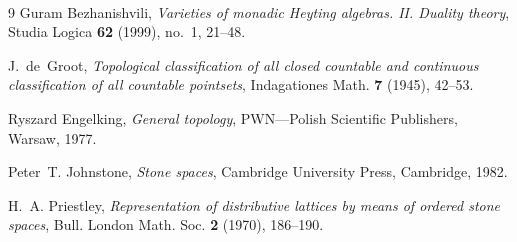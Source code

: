 \newpage\ %
%
\setlength{\baselineskip}{\singlespace}%

\begin{thebibliography}{9}
 Guram Bezhanishvili, \emph{Varieties of monadic {H}eyting
algebras. {I}{I}. {D}uality theory}, Studia Logica \textbf{62} (1999),
no.~1, 21--48.

 J.~de~Groot, \emph{Topological classification of all closed
countable and continuous classification of all countable pointsets},
Indagationes Math. \textbf{7} (1945), 42--53.

 Ryszard Engelking, \emph{General topology}, PWN---Polish
Scientific Publishers, Warsaw, 1977.

 Peter~T. Johnstone, \emph{Stone spaces}, Cambridge
University Press, Cambridge, 1982.

 H.~A. Priestley, \emph{Representation of distributive
lattices by means of ordered stone spaces}, Bull. London Math. Soc. \textbf{2%
} (1970), 186--190.
\end{thebibliography}
